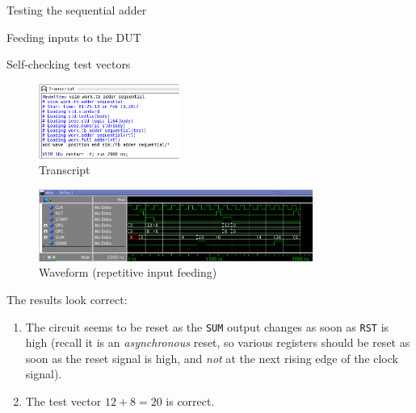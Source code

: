 \documentclass[lab]{course}
\begin{document}
\begin{section}{Testing the sequential adder}
\begin{subsection}{Feeding inputs to the DUT}
\begin{subsubsection}{Self-checking test vectors}
\begin{enumerate}
                \begin{figure}[!h]
                    \begin{centering}
                        \includegraphics[width=0.41\textwidth]{figs/waveform_sequential_transcript_basic_version.png}
                        \caption{Transcript}
                        \label{fig:waveform_sequential_transcript_basic_version}
                    \end{centering}
                \end{figure}

                \newpage

                \begin{figure}[!h]
                    \begin{centering}
                        \includegraphics[width=0.8\textwidth]{figs/waveform_sequential_process_reexecutes.png}
                        \caption{Waveform (repetitive input feeding)}
                        \label{fig:waveform_sequential_process_reexecutes}
                    \end{centering}
                \end{figure}

                The results look correct:

                \begin{enumerate}
                    \item The circuit seems to be reset as the \verb+SUM+ output changes as soon as \verb+RST+ is high (recall it is an \emph{asynchronous} reset, so various registers should be reset as soon as the reset signal is high, and \emph{not} at the next rising edge of the clock signal).

                    \item The test vector $12 + 8 = 20$ is correct.
                \end{enumerate}


\end{enumerate}
\end{subsubsection}
\end{subsection}
\end{section}
\end{document}
